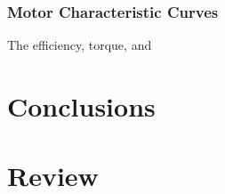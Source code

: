 \documentclass[twoside,a4]{report}
\def\shorttitle{Development of a Rheometer Controller}
\def\achapter{\shorttitle}  %
\begin{document}
	\subsection*{Motor Characteristic Curves} %
	The efficiency, torque, and 
	



	\chapter*{Conclusions}
	\def\achapter{Conclusions}
	


	\chapter*{Review}
	\def\achapter{Review}
	

\end{document}
